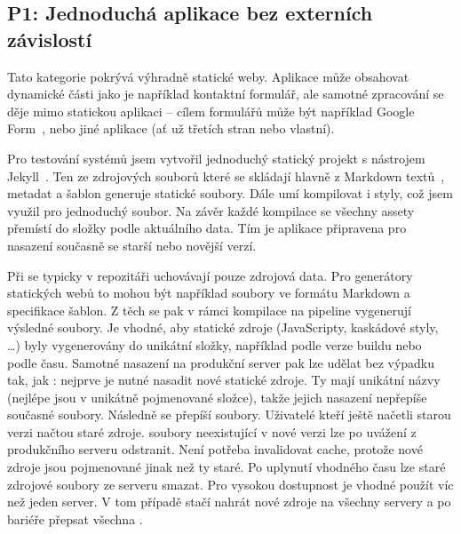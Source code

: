     \subsection{P1: Jednoduchá aplikace bez externích závislostí}
        Tato kategorie pokrývá výhradně statické weby. Aplikace může obsahovat dynamické části jako je například kontaktní formulář, ale samotné zpracování se děje mimo statickou aplikaci -- cílem formulářů může být například Google Form~\cite{mccoy-google-form}, nebo jiné aplikace (ať už třetích stran nebo vlastní).

        Pro testování \CICD systémů jsem vytvořil jednoduchý statický projekt s nástrojem Jekyll~\cite{jekyll}. Ten ze zdrojových souborů které se skládají hlavně z Markdown textů~\cite{markdown}, metadat a šablon generuje statické \HTML soubory. Dále umí kompilovat i styly, což jsem využil pro jednoduchý  soubor. Na závěr každé kompilace se všechny assety přemístí do složky podle aktuálního data. Tím je aplikace připravena pro nasazení současně se starší nebo novější verzí.

        Při \CICD se typicky v repozitáři uchovávají pouze zdrojová data. Pro generátory statických webů to mohou být například soubory ve formátu Markdown a specifikace \HTML šablon. Z těch se pak v rámci kompilace na \CICD pipeline vygenerují výsledné \HTML soubory. Je vhodné, aby statické zdroje (JavaScripty, kaskádové styly, \ldots) byly vygenerovány do unikátní složky, například podle verze buildu nebo podle času. Samotné nasazení na produkční server pak lze udělat bez výpadku tak, jak : nejprve je nutné nasadit nové statické zdroje. Ty mají unikátní názvy (nejlépe jsou v unikátně pojmenované složce), takže jejich nasazení nepřepíše současné soubory. Následně se přepíší \HTML soubory. Uživatelé kteří ještě načetli starou verzi načtou staré zdroje. \HTML soubory neexistující v nové verzi lze po uvážení z produkčního serveru odstranit. Není potřeba invalidovat cache, protože nové zdroje jsou pojmenované jinak než ty staré. Po uplynutí vhodného času lze staré zdrojové soubory ze serveru smazat. Pro vysokou dostupnost je vhodné použít víc než jeden server. V tom případě stačí nahrát nové zdroje na všechny servery a po bariéře přepsat všechna \HTML.

